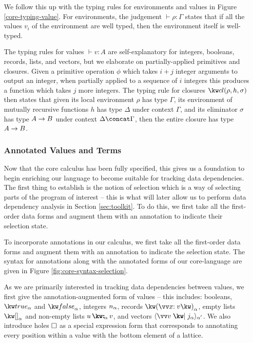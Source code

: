 \noindent
We follow this up with the typing rules for environments and values in Figure \ref{core-typing-value}. For environments, the judgement $\vdash \rho: \Gamma$ states that if all the values $v_i$ of the environment are well typed, then the environment itself is well-typed. 

The typing rules for values $\vdash v: A$ are self-explanatory for integers, booleans, records, lists, and vectors, but we elaborate on partially-applied primitives and closures. Given a primitive operation $\phi$ which takes $i+j$ integer arguments to output an integer, when partially applied to a sequence of $i$ integers this produces a function which takes $j$ more integers. The typing rule for closures $\exClosure{\rho}{h}{\sigma}$ then states that given its local environment $\rho$ has type $\Gamma$, its environment of mutually recursive functions $h$ has type $\Delta$ under context $\Gamma$, and its eliminator $\sigma$ has type ${A}\rightarrow{B}$ under context $\Delta \concat \Gamma$, then the entire closure has type ${A}\rightarrow{B}$.



\subsubsection{Annotated Values and Terms}

Now that the core calculus has been fully specified, this gives us a foundation to begin enriching our language to become suitable for tracking data dependencies. The first thing to establish is the notion of selection which is a way of selecting parts of the program of interest -- this is what will later allow us to perform data dependency analysis in Section \ref{sec:toolkit}. To do this, we first take all the first-order data forms and augment them with an annotation to indicate their selection state.



\noindent
To incorporate annotations in our calculus, we first take all the first-order data forms and augment them with an annotation to indicate the selection state. The syntax for annotations along with the annotated forms of our core-language are given in Figure \ref{fig:core-syntax-selection}. 

As we are primarily interested in tracking data dependencies between values, we first give the annotation-augmented form of values -- this includes: booleans, $\annTrue{\alpha}$ and $\annFalse{\alpha}$, integers $n_{\alpha}$, records $\annRec{\vec{\bind{x}{v}}}{\alpha}$, empty lists $\annNil{\alpha}$ and non-empty lists $\annCons{u}{v}{\alpha}$, and vectors $\annVecVal{\vec{v}}{\annInt{j}{\alpha}}{\smash{\alpha'}}$. We also introduce holes $\square$ as a special expression form that corresponds to annotating every position within a value with the bottom element of a lattice.

